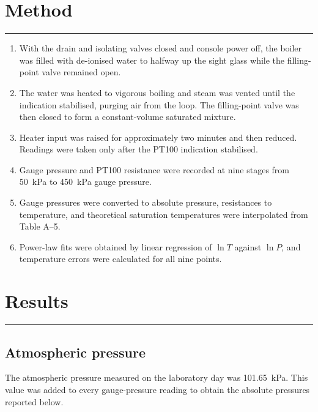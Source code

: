\documentclass[11pt,a4paper]{article}
\newcommand{\sectionrule}{\vspace{-2pt}\color{rulegray}\hrule\color{black}\vspace{5pt}}
\begin{document}
\section{Method}
\sectionrule
\begin{enumerate}
  \item With the drain and isolating valves closed and console power off, the
        boiler was filled with de-ionised water to halfway up the sight glass
        while the filling-point valve remained open.
  \item The water was heated to vigorous boiling and steam was vented until the
        indication stabilised, purging air from the loop. The filling-point valve
        was then closed to form a constant-volume saturated mixture.
  \item Heater input was raised for approximately two minutes and then reduced.
        Readings were taken only after the PT100 indication stabilised.
  \item Gauge pressure and PT100 resistance were recorded at nine stages from
        \SI{50}{\kilo\pascal} to \SI{450}{\kilo\pascal} gauge pressure.
  \item Gauge pressures were converted to absolute pressure, resistances to
        temperature, and theoretical saturation temperatures were interpolated
        from Table A--5.
  \item Power-law fits were obtained by linear regression of $\ln T$ against
        $\ln P$, and temperature errors were calculated for all nine points.
\end{enumerate}

\section{Results}
\sectionrule
\subsection{Atmospheric pressure}
The atmospheric pressure measured on the laboratory day was
\SI{101.65}{\kilo\pascal}. This value was added to every gauge-pressure reading
to obtain the absolute pressures reported below.
\end{document}
